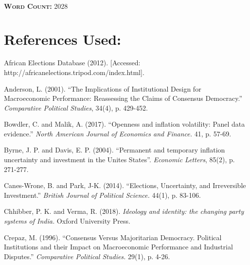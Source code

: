 \documentclass[11pt, oneside]{article}   	%
\let\oldparagraph\paragraph
\renewcommand{\paragraph}[1]{\oldparagraph{#1}\mbox{}}
\begin{document}
\paragraph{}
\begin{flushleft}
\textbf{\textsc{Word Count:}} 2028
\end{flushleft}

\newpage

\section*{References Used:}
\begin{flushleft}
African Elections Database (2012). [Accessed: http://africanelections.tripod.com/index.html].
\end{flushleft}
\begin{flushleft}
Anderson, L. (2001). “The Implications of Institutional Design for Macroeconomic Performance: Reassessing the Claims of Consensus Democracy.” \textit{Comparative Political Studies}, 34(4), p. 429-452.
\end{flushleft}
\begin{flushleft}
Bowdler, C. and Malik, A. (2017). “Openness and inflation volatility: Panel data evidence.” \textit{North American Journal of Economics and Finance.} 41, p. 57-69.
\end{flushleft}

\begin{flushleft}

Byrne, J. P. and Davis, E. P. (2004). “Permanent and temporary inflation uncertainty and investment in the Unites States”. \textit{Economic Letters}, 85(2), p. 271-277.
\end{flushleft}

\begin{flushleft}

Canes-Wrone, B. and Park, J-K. (2014). “Elections, Uncertainty, and Irreversible Investment.” \textit{British Journal of Political Science.} 44(1), p. 83-106.
\end{flushleft}

\begin{flushleft}

Chhibber, P. K. and Verma, R. (2018). \textit{Ideology and identity: the changing party systems of India.} Oxford University Press.
\end{flushleft}

\begin{flushleft}

Crepaz, M. (1996). “Consensus Versus Majoritarian Democracy. Political Institutions and their Impact on Macroeconomic Performance and Industrial Disputes.” \textit{Comparative Political Studies.} 29(1), p. 4-26.
\end{flushleft}
\end{document}
